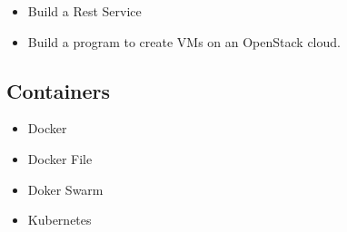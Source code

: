 
\begin{itemize}
\item Build a Rest Service
\item Build a program to create VMs on an OpenStack cloud.
\end{itemize}



\subsection{Containers}

\begin{itemize}
\item Docker 
\item Docker File
\item Doker Swarm
\item Kubernetes
\end{itemize}





